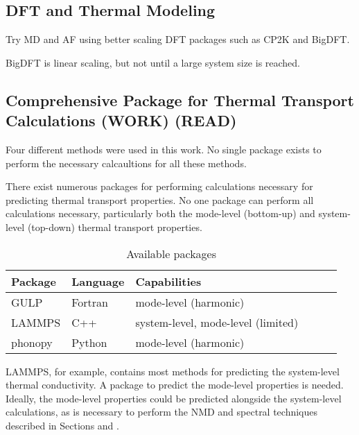 \subsection{\label{Future:DFT}DFT and Thermal Modeling}

Try MD and AF using better scaling DFT packages such as CP2K and BigDFT. 

BigDFT is linear scaling, but not until a large system size is reached. 

\subsection{\label{Future:Package}
Comprehensive Package for Thermal Transport Calculations (WORK) (READ)}

Four different methods were used in this work. No single package 
exists to perform the necessary calcaultions for all these methods. 


There exist numerous packages for performing calculations necessary for 
predicting thermal transport properties. No one package can perform all 
calculations necessary, particularly both the 
mode-level (bottom-up) and system-level (top-down) thermal transport 
properties.   

\begin{center}
\begingroup
\begin{table}
\caption{\label{T:available_codes}
Available packages
}
\begin{tabular}{llllll}
\hline
Package & Language & Capabilities \\
\hline
GULP & Fortran & mode-level (harmonic) \\
LAMMPS & C++ & system-level, mode-level (limited) \\
phonopy & Python & mode-level (harmonic) \\
\end{tabular}
\end{table}
\endgroup
\end{center}

LAMMPS, for example, contains most methods for predicting the 
system-level thermal conductivity. A package to predict the 
mode-level properties is needed.  Ideally, the mode-level properties 
could be predicted alongside the system-level calculations, as is 
necessary to perform the NMD and spectral techniques described in 
Sections and . 

